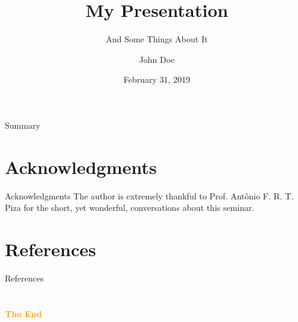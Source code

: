 \documentclass[aspectratio=43]{beamer}
\title{My Presentation} %
\subtitle{And Some Things About It}
\author[J. Doe]{John Doe}
\institute[IFUSP]{
    Institute of Physics%
    \\%
    University of São Paulo%
} %
\date{February 31, 2019}
\begin{document}
    
    \frame{\titlepage}
    
    \begin{frame}{Summary}
        \tableofcontents
    \end{frame}
    
     
    
    
    
    
    
    \section*{Acknowledgments} %
        \begin{frame}{Acknowledgments}
            The author is extremely thankful to Prof. Antônio F. R. T. Piza for the short, yet wonderful, conversations about this seminar.
        \end{frame}
    
    \section*{References} %
        \nocite{Djairo} \nocite{PhilPanof} \nocite{Fleming} \nocite{Shankar}
        \begin{frame}{References}
            \printbibliography
        \end{frame}

    \section{}
    \begin{frame}{}
        \centering
            \Huge\bfseries
        \textcolor{orange}{The End}
    \end{frame}
\end{document}
